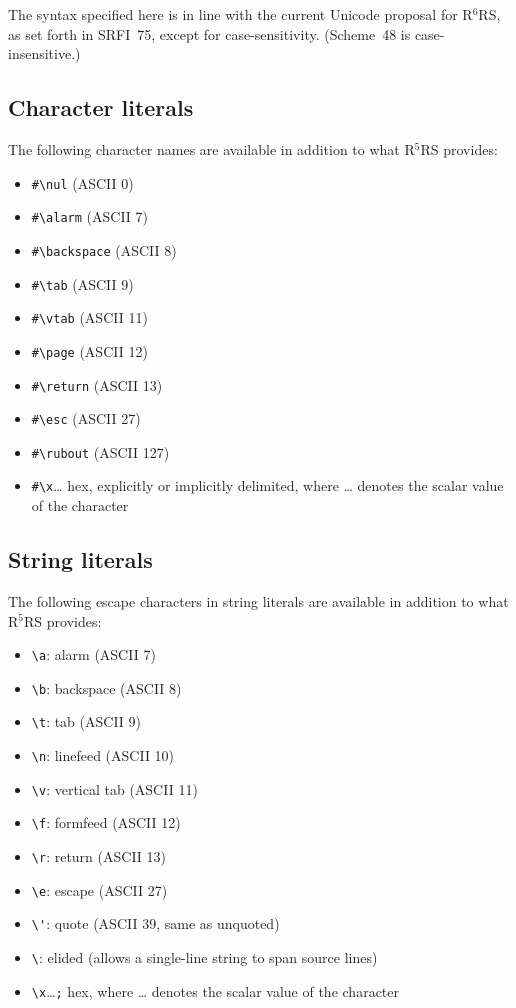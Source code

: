 The syntax specified here is in line with the current Unicode proposal
for R$^6$RS, as set forth in SRFI~75, except for case-sensitivity.
(Scheme~48 is case-insensitive.)

\subsection{Character literals}

The following character names are available in addition to what
R$^5$RS provides:
%
\begin{itemize}
\item \verb|#\nul| (ASCII 0) 
\item \verb|#\alarm| (ASCII 7) 
\item \verb|#\backspace| (ASCII 8) 
\item \verb|#\tab| (ASCII 9) 
\item \verb|#\vtab| (ASCII 11) 
\item \verb|#\page| (ASCII 12) 
\item \verb|#\return| (ASCII 13) 
\item \verb|#\esc| (ASCII 27) 
\item \verb|#\rubout| (ASCII 127) 
\item \verb|#\x|\ldots{} hex, explicitly or implicitly
  delimited, where \ldots{} denotes the scalar value
  of the character
\end{itemize}

\subsection{String literals}

The following escape characters in string literals are available in addition to what
R$^5$RS provides:

\begin{itemize}
\item \verb|\a|: alarm (ASCII 7) 
\item \verb|\b|: backspace (ASCII 8) 
\item \verb|\t|: tab (ASCII 9) 
\item \verb|\n|: linefeed (ASCII 10) 
\item \verb|\v|: vertical tab (ASCII 11) 
\item \verb|\f|: formfeed (ASCII 12) 
\item \verb|\r|: return (ASCII 13) 
\item \verb|\e|: escape (ASCII 27) 
\item \verb|\'|: quote (ASCII 39, same as unquoted) 
\item \verb|\|: elided (allows a single-line string to
  span source lines)
\item \verb|\x|\ldots{}\verb|;| hex, where \ldots{}
  denotes the scalar value of the character
\end{itemize}

